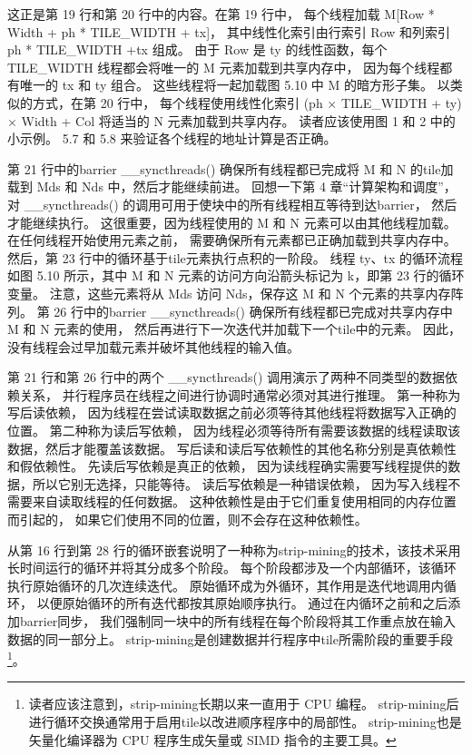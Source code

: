 这正是第 19 行和第 20 行中的内容。在第 19 行中，
每个线程加载 M[Row * Width + ph * TILE\_WIDTH + tx]，
其中线性化索引由行索引 Row 和列索引 ph * TILE\_WIDTH +tx 组成。 
由于 Row 是 ty 的线性函数，每个 TILE\_WIDTH 线程都会将唯一的 M 元素加载到共享内存中，
因为每个线程都有唯一的 tx 和 ty 组合。 这些线程将一起加载图 5.10 中 M 的暗方形子集。 
以类似的方式，在第 20 行中，
每个线程使用线性化索引 (ph × TILE\_WIDTH + ty) × Width + Col 将适当的 N 元素加载到共享内存。
读者应该使用图 1 和 2 中的小示例。 5.7 和 5.8 来验证各个线程的地址计算是否正确。

第 21 行中的barrier \_\_syncthreads() 确保所有线程都已完成将 M 和 N 的tile加载到 Mds 和 Nds 中，然后才能继续前进。 
回想一下第 4 章“计算架构和调度”，对 \_\_syncthreads() 的调用可用于使块中的所有线程相互等待到达barrier，
然后才能继续执行。 这很重要，因为线程使用的 M 和 N 元素可以由其他线程加载。 在任何线程开始使用元素之前，
需要确保所有元素都已正确加载到共享内存中。 然后，第 23 行中的循环基于tile元素执行点积的一阶段。 
线程 ty、tx 的循环流程如图 5.10 所示，其中 M 和 N 元素的访问方向沿箭头标记为 k，即第 23 行的循环变量。
注意，这些元素将从 Mds 访问 Nds，保存这 M 和 N 个元素的共享内存阵列。 
第 26 行中的barrier \_\_syncthreads() 确保所有线程都已完成对共享内存中 M 和 N 元素的使用，
然后再进行下一次迭代并加载下一个tile中的元素。 因此，没有线程会过早加载元素并破坏其他线程的输入值。

第 21 行和第 26 行中的两个 \_\_syncthreads() 调用演示了两种不同类型的数据依赖关系，
并行程序员在线程之间进行协调时通常必须对其进行推理。 第一种称为写后读依赖，
因为线程在尝试读取数据之前必须等待其他线程将数据写入正确的位置。 第二种称为读后写依赖，
因为线程必须等待所有需要该数据的线程读取该数据，然后才能覆盖该数据。 
写后读和读后写依赖性的其他名称分别是真依赖性和假依赖性。 先读后写依赖是真正的依赖，
因为读线程确实需要写线程提供的数据，所以它别无选择，只能等待。 读后写依赖是一种错误依赖，
因为写入线程不需要来自读取线程的任何数据。 这种依赖性是由于它们重复使用相同的内存位置而引起的，
如果它们使用不同的位置，则不会存在这种依赖性。

从第 16 行到第 28 行的循环嵌套说明了一种称为strip-mining的技术，该技术采用长时间运行的循环并将其分成多个阶段。 
每个阶段都涉及一个内部循环，该循环执行原始循环的几次连续迭代。 原始循环成为外循环，其作用是迭代地调用内循环，
以便原始循环的所有迭代都按其原始顺序执行。 通过在内循环之前和之后添加barrier同步，
我们强制同一块中的所有线程在每个阶段将其工作重点放在输入数据的同一部分上。 
strip-mining是创建数据并行程序中tile所需阶段的重要手段
\footnote{读者应该注意到，strip-mining长期以来一直用于 CPU 编程。 
strip-mining后进行循环交换通常用于启用tile以改进顺序程序中的局部性。 
strip-mining也是矢量化编译器为 CPU 程序生成矢量或 SIMD 指令的主要工具。}。

